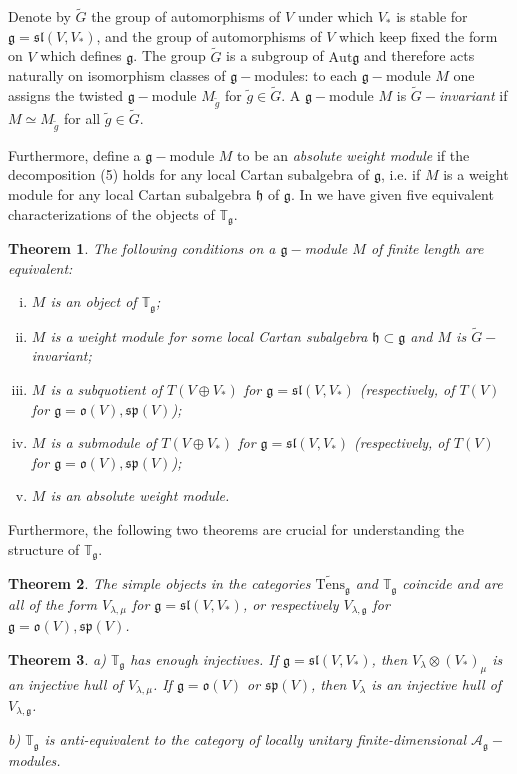 \documentclass[10pt]{amsart}
\newcounter{theorem}
\newtheorem{theo}{Theorem}[section]
\newcommand{\TT}{\mathbb{T}}
\renewcommand{\sp}{\mathfrak{sp}}
\renewcommand{\sl}{\mathfrak{sl}}
\newcommand{\oo}{\mathfrak{o}}
\newcommand{\hh}{\mathfrak{h}}
\renewcommand{\gg}{\mathfrak{g}}
\begin{document}
Denote by $\tilde{G}$ the group of automorphisms of $V$ under which $V_*$ is stable for $\gg = \sl(V,V_*)$, and the group of automorphisms of $V$ which keep fixed the form on $V$ which defines $\gg$. The group $\tilde{G}$ is a subgroup of $\mathrm{Aut}\gg$ and therefore acts naturally on isomorphism classes of $\gg-$modules: to each $\gg-$module $M$ one assigns the twisted $\gg-$module $M_{\tilde{g}}$ for $\tilde{g} \in \tilde{G}$. A $\gg-$module $M$ is \textit{$\tilde{G}-$invariant} if $M \simeq M_{\tilde{g}}$ for all $\tilde{g} \in \tilde{G}$. 

Furthermore, define a $\gg-$module $M$ to be an \textit{absolute weight module} if the decomposition (5) holds for any local Cartan subalgebra of $\gg$, i.e. if $M$ is a weight module for any local Cartan subalgebra $\hh$ of $\gg$. In \cite{DPS} we have given five equivalent characterizations of the objects of $\TT_{\gg}$.

\begin{theo}\label{th:6.1}\cite{DPS} The following conditions on a $\gg-$module $M$ of finite length are equivalent:
\begin{enumerate}[i)]
 \item $M$ is an object of $\TT_{\gg}$;
 \item $M$ is a weight module for some local Cartan subalgebra $\hh \subset \gg$ and $M$ is $\tilde{G}-$invariant;
 \item $M$ is a subquotient of $T(V\oplus V_*)$ for $\gg = \sl(V,V_*)$ (respectively, of $T(V)$ for $\gg = \oo(V), \sp(V)$);
 \item $M$ is a submodule of $T(V\oplus V_*)$ for $\gg = \sl(V,V_*)$ (respectively, of $T(V)$ for $\gg = \oo(V), \sp(V)$);
 \item $M$ is an absolute weight module.
\end{enumerate}
\end{theo}

Furthermore, the following two theorems are crucial for understanding the structure of $\TT_\gg$.

\begin{theo}\label{kos1} \cite{ps} \cite{DPS} 
   The simple objects in the categories $\widetilde{\mathrm{Tens}}_{\gg}$ and $\TT_{\gg}$ coincide and are all of the form $V_{\lambda,\mu}$ for $\gg = \sl(V,V_*)$, 
or respectively $V_{\lambda,\gg}$ for $\gg=\oo(V), \sp(V)$.
\end{theo}

\begin{theo}\label{kos2}\cite{DPS} a) $\TT_{\gg}$ has enough injectives. If $\gg=\sl(V,V_*)$, then $V_\lambda\otimes (V_*)_\mu$ is an injective hull of
$V_{\lambda,\mu}$.  If $\gg=\oo(V)$ or $\sp(V)$, then $V_\lambda$ is an injective hull of $V_{\lambda,\gg}$.

b) $\TT_{\gg}$ is anti-equivalent to the category of locally unitary finite-dimensional $\mathcal{A}_\gg-$modules.
\end{theo}
\end{document}

